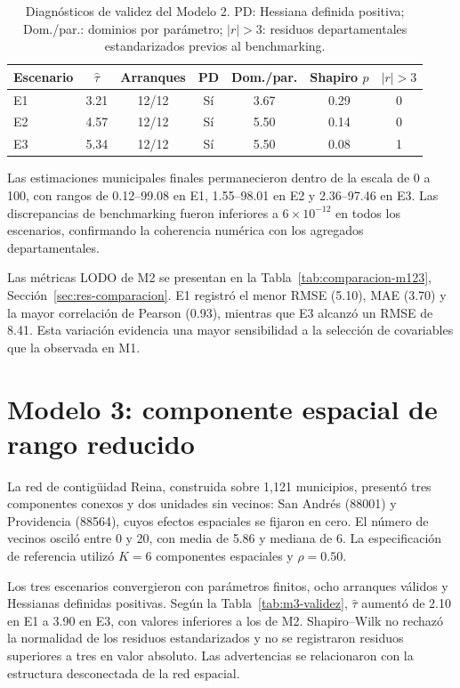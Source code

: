 \begin{table}[!htbp]
\centering
\footnotesize
\caption{Diagnósticos de validez del Modelo 2. PD: Hessiana definida positiva; Dom./par.: dominios por parámetro; $|r|>3$: residuos departamentales estandarizados previos al benchmarking.}
\label{tab:m2-validez}
\renewcommand{\arraystretch}{1.1}
\setlength{\tabcolsep}{5pt}
\begin{tabular}{l c c c c c c}
\hline
Escenario & $\hat{\tau}$ & Arranques & PD & Dom./par. & Shapiro $p$ & $|r|>3$ \\
\hline
E1 & 3.21 & 12/12 & Sí & 3.67 & 0.29 & 0 \\
E2 & 4.57 & 12/12 & Sí & 5.50 & 0.14 & 0 \\
E3 & 5.34 & 12/12 & Sí & 5.50 & 0.08 & 1 \\
\hline
\end{tabular}
\end{table}

Las estimaciones municipales finales permanecieron dentro de la escala de 0 a 100, con rangos de 0.12--99.08 en E1, 1.55--98.01 en E2 y 2.36--97.46 en E3. Las discrepancias de benchmarking fueron inferiores a $6\times10^{-12}$ en todos los escenarios, confirmando la coherencia numérica con los agregados departamentales.

Las métricas LODO de M2 se presentan en la Tabla~\ref{tab:comparacion-m123}, Sección~\ref{sec:res-comparacion}. E1 registró el menor RMSE (5.10), MAE (3.70) y la mayor correlación de Pearson (0.93), mientras que E3 alcanzó un RMSE de 8.41. Esta variación evidencia una mayor sensibilidad a la selección de covariables que la observada en M1.


\section{Modelo 3: componente espacial de rango reducido}
\label{sec:res-car}

La red de contigüidad Reina, construida sobre 1{,}121 municipios, presentó tres componentes conexos y dos unidades sin vecinos: San Andrés (88001) y Providencia (88564), cuyos efectos espaciales se fijaron en cero. El número de vecinos osciló entre 0 y 20, con media de 5.86 y mediana de 6. La especificación de referencia utilizó $K=6$ componentes espaciales y $\rho=0.50$.

Los tres escenarios convergieron con parámetros finitos, ocho arranques válidos y Hessianas definidas positivas. Según la Tabla~\ref{tab:m3-validez}, $\hat{\tau}$ aumentó de 2.10 en E1 a 3.90 en E3, con valores inferiores a los de M2. Shapiro--Wilk no rechazó la normalidad de los residuos estandarizados y no se registraron residuos superiores a tres en valor absoluto. Las advertencias se relacionaron con la estructura desconectada de la red espacial.

